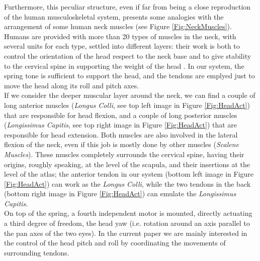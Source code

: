 \documentclass[conference]{IEEEtran}
\numberwithin{equation}{section}
\begin{document}
Furthermore, this peculiar structure, even if far from being a close reproduction of the human musculoskeletal system, presents some analogies with the arrangement of some human neck muscles (see Figure \ref{Fig:NeckMuscles}). Humans are provided with more than 20 types of muscles in the neck, with several units for each type, settled into different layers: their work is both to control the orientation of the head respect to the neck base and to give stability to the cervical spine in supporting the weight of the head \cite{Kendall05muscles}. In our system, the spring tone is sufficient to support the head, and the tendons are emplyed just to move the head along its roll and pitch axes.\\If we consider the deeper muscular layer around the neck, we can find a couple of long anterior muscles (\emph{Longus Colli}, see top left image in Figure \ref{Fig:HeadAct}) that are responsible for head flexion, and a couple of long posterior muscles (\emph{Longissimus Capitis}, see top right image in Figure \ref{Fig:HeadAct}) that are responsible for head extension. Both muscles are also involved in the lateral flexion of the neck, even if this job is mostly done by other muscles (\emph{Scalene Muscles}). These muscles completely surrounds the cervical spine, having their origins, roughly speaking, at the level of the scapula, and their insertions at the level of the atlas; the anterior tendon in our system (bottom left image in Figure \ref{Fig:HeadAct}) can work as the \emph{Longus Colli}, while the two tendons in the back (bottom right image in Figure \ref{Fig:HeadAct}) can emulate the \emph{Longissimus Capitis}.\\On top of the spring, a fourth independent motor is mounted, directly actuating a third degree of freedom, the head yaw (i.e. rotation around an axis parallel to the pan axes of the two eyes). In the current paper we are mainly interested in the control of the head pitch and roll by coordinating the movements of surrounding tendons.
\end{document}
